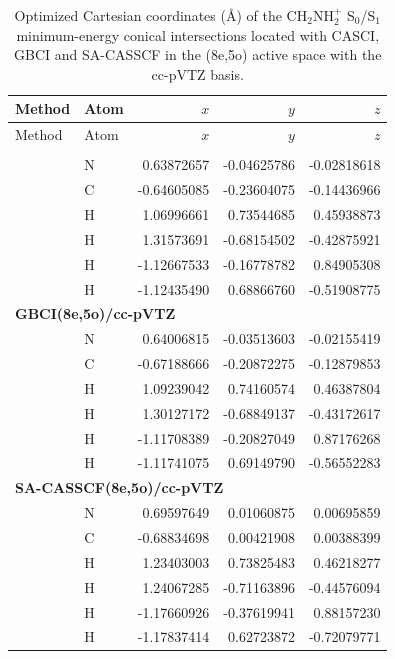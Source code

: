 \begin{longtable}{llrrr}
\caption{Optimized Cartesian coordinates (\AA) of the CH$_2$NH$_2^+$ S$_0$/S$_1$ minimum-energy conical intersections located with CASCI, GBCI and SA-CASSCF in the (8e,5o) active space with the cc-pVTZ basis.}\label{tab:si_ch2nh2_ccpvtz_meci_geometries}\\
\hline
Method & Atom & $x$ & $y$ & $z$ \\
\hline
\endfirsthead
\hline
Method & Atom & $x$ & $y$ & $z$ \\
\hline
\endhead
\hline
\endfoot
\multicolumn{5}{l}{\textbf{CASCI(8e,5o)/cc-pVTZ}}\\
 & N &  0.63872657 & -0.04625786 & -0.02818618 \\
 & C & -0.64605085 & -0.23604075 & -0.14436966 \\
 & H &  1.06996661 &  0.73544685 &  0.45938873 \\
 & H &  1.31573691 & -0.68154502 & -0.42875921 \\
 & H & -1.12667533 & -0.16778782 &  0.84905308 \\
 & H & -1.12435490 &  0.68866760 & -0.51908775 \\
\multicolumn{5}{l}{\textbf{GBCI(8e,5o)/cc-pVTZ}}\\
 & N &  0.64006815 & -0.03513603 & -0.02155419 \\
 & C & -0.67188666 & -0.20872275 & -0.12879853 \\
 & H &  1.09239042 &  0.74160574 &  0.46387804 \\
 & H &  1.30127172 & -0.68849137 & -0.43172617 \\
 & H & -1.11708389 & -0.20827049 &  0.87176268 \\
 & H & -1.11741075 &  0.69149790 & -0.56552283 \\
\multicolumn{5}{l}{\textbf{SA-CASSCF(8e,5o)/cc-pVTZ}}\\
 & N &  0.69597649 &  0.01060875 &  0.00695859 \\
 & C & -0.68834698 &  0.00421908 &  0.00388399 \\
 & H &  1.23403003 &  0.73825483 &  0.46218277 \\
 & H &  1.24067285 & -0.71163896 & -0.44576094 \\
 & H & -1.17660926 & -0.37619941 &  0.88157230 \\
 & H & -1.17837414 &  0.62723872 & -0.72079771 \\
\end{longtable}
